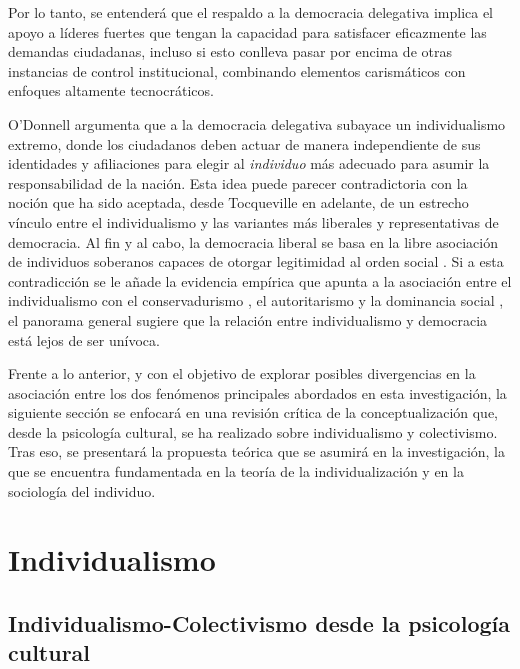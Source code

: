 \documentclass[12pt,twoside]{templates/facsothesis}
\begin{document}
Por lo tanto, se entenderá que el respaldo a la democracia delegativa implica el apoyo a líderes fuertes que tengan la capacidad para satisfacer eficazmente las demandas ciudadanas, incluso si esto conlleva pasar por encima de otras instancias de control institucional, combinando elementos carismáticos con enfoques altamente tecnocráticos.

O'Donnell \citeyearpar{odonnell1994} argumenta que a la democracia delegativa subayace un individualismo extremo, donde los ciudadanos deben actuar de manera independiente de sus identidades y afiliaciones para elegir al \emph{individuo} más adecuado para asumir la responsabilidad de la nación. Esta idea puede parecer contradictoria con la noción que ha sido aceptada, desde Tocqueville en adelante, de un estrecho vínculo entre el individualismo y las variantes más liberales y representativas de democracia. Al fin y al cabo, la democracia liberal se basa en la libre asociación de individuos soberanos capaces de otorgar legitimidad al orden social \citep{martuccelli2010}. Si a esta contradicción se le añade la evidencia empírica que apunta a la asociación entre el individualismo con el conservadurismo \citep{zhang2009}, el autoritarismo \citep{kemmelmeier2003} y la dominancia social \citep{strunk1999}, el panorama general sugiere que la relación entre individualismo y democracia está lejos de ser unívoca.

Frente a lo anterior, y con el objetivo de explorar posibles divergencias en la asociación entre los dos fenómenos principales abordados en esta investigación, la siguiente sección se enfocará en una revisión crítica de la conceptualización que, desde la psicología cultural, se ha realizado sobre individualismo y colectivismo. Tras eso, se presentará la propuesta teórica que se asumirá en la investigación, la que se encuentra fundamentada en la teoría de la individualización y en la sociología del individuo.

\hypertarget{individualismo}{%
\section{Individualismo}\label{individualismo}}

\hypertarget{individualismo-colectivismo-desde-la-psicologuxeda-cultural}{%
\subsection{Individualismo-Colectivismo desde la psicología cultural}\label{individualismo-colectivismo-desde-la-psicologuxeda-cultural}}
\end{document}
